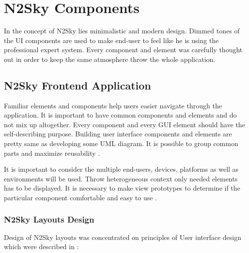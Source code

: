 \section{N2Sky Components}\label{N2Sky Components}

In the concept of N2Sky lies minimalistic and modern design. Dimmed tones of the UI components are used to make end-user to feel like he is using the professional expert system. Every component and element was carefully thought out in order to keep the same atmosphere throw the whole application. 

\subsection{N2Sky Frontend Application}\label{N2Sky Frontend Application}


Familiar elements and components help users easier navigate through the application. It is important to have common components and elements and do not mix up altogether. Every component and every GUI element should have the self-describing purpose. Building user interface components and elements are pretty same as developing some UML diagram. It is possible to group common parts and maximize reusability \cite{mod_ui_book}. 

It is important to consider the multiple end-users, devices, platforms as well as environments will be used. Throw heterogeneous context only needed elements has to be displayed. It is necessary to make view prototypes to determine if the particular component comfortable and easy to use \cite{Martinez2017}. 

\subsubsection{N2Sky Layouts Design}\label{N2Sky Layouts Design}


Design of N2Sky layouts was concentrated on principles of User interface design which were described in \cite{gui_layout}: 

